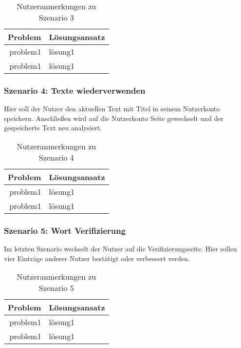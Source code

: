 \begin{table}[h!]
	\centering
	\begin{tabular}{|r|l|}
		\hline
		\textbf{Problem} & \textbf{Lösungsansatz}\\
		\hline
		\hline
		problem1 & lösung1\\
		\hline
		problem1 & lösung1\\
		\hline
	\end{tabular}
	\caption{Nutzeranmerkungen zu Szenario 3}
	\label{table:szenario3}
\end{table}

\subsubsection{Szenario 4: Texte wiederverwenden}

Hier soll der Nutzer den aktuellen Text mit Titel in seinem Nutzerkonto speichern. Anschließen wird auf die Nutzerkonto Seite gewechselt und der gespeicherte Text neu analysiert.

\begin{table}[h!]
	\centering
	\begin{tabular}{|r|l|}
		\hline
		\textbf{Problem} & \textbf{Lösungsansatz}\\
		\hline
		\hline
		problem1 & lösung1\\
		\hline
		problem1 & lösung1\\
		\hline
	\end{tabular}
	\caption{Nutzeranmerkungen zu Szenario 4}
	\label{table:szenario4}
\end{table}

\subsubsection{Szenario 5: Wort Verifizierung}

Im letzten Szenario wechselt der Nutzer auf die Verifizierungsseite. Hier sollen vier Einträge anderer Nutzer bestätigt oder verbessert verden.

\begin{table}[h!]
	\centering
	\begin{tabular}{|r|l|}
		\hline
		\textbf{Problem} & \textbf{Lösungsansatz}\\
		\hline
		\hline
		problem1 & lösung1\\
		\hline
		problem1 & lösung1\\
		\hline
	\end{tabular}
	\caption{Nutzeranmerkungen zu Szenario 5}
	\label{table:szenario5}
\end{table}


